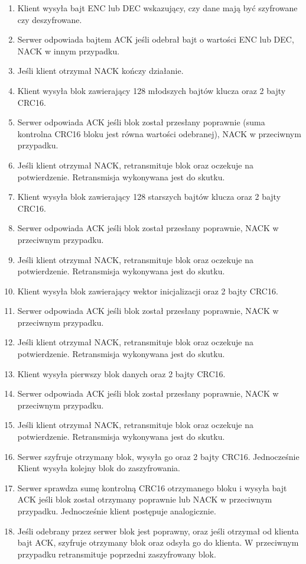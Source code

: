 \begin{enumerate}[noitemsep]
\item Klient wysyła bajt ENC lub DEC wskazujący, czy dane mają być szyfrowane czy deszyfrowane.
\item Serwer odpowiada bajtem ACK jeśli odebrał bajt o wartości ENC lub DEC, NACK w innym przypadku.
\item Jeśli klient otrzymał NACK kończy działanie.
\item Klient wysyła blok zawierający 128 młodszych bajtów klucza oraz 2 bajty CRC16.
\item Serwer odpowiada ACK jeśli blok został przesłany poprawnie (suma kontrolna CRC16 bloku jest równa wartości odebranej), NACK w przeciwnym przypadku.
\item Jeśli klient otrzymał NACK, retransmituje blok oraz oczekuje na potwierdzenie. Retransmisja wykonywana jest do skutku.
\item Klient wysyła blok zawierający 128 starszych bajtów klucza oraz 2 bajty CRC16.
\item Serwer odpowiada ACK jeśli blok został przesłany poprawnie, NACK w przeciwnym przypadku.
\item Jeśli klient otrzymał NACK, retransmituje blok oraz oczekuje na potwierdzenie. Retransmisja wykonywana jest do skutku.
\item Klient wysyła blok zawierający wektor inicjalizacji oraz 2 bajty CRC16.
\item Serwer odpowiada ACK jeśli blok został przesłany poprawnie, NACK w przeciwnym przypadku.
\item Jeśli klient otrzymał NACK, retransmituje blok oraz oczekuje na potwierdzenie. Retransmisja wykonywana jest do skutku.
\item Klient wysyła pierwszy blok danych oraz 2 bajty CRC16.
\item Serwer odpowiada ACK jeśli blok został przesłany poprawnie, NACK w przeciwnym przypadku.
\item Jeśli klient otrzymał NACK, retransmituje blok oraz oczekuje na potwierdzenie. Retransmisja wykonywana jest do skutku.
\item Serwer szyfruje otrzymany blok, wysyła go oraz 2 bajty CRC16. Jednocześnie Klient wysyła kolejny blok do zaszyfrowania.
\item Serwer sprawdza sumę kontrolną CRC16 otrzymanego bloku i wysyła bajt ACK jeśli blok został otrzymany poprawnie lub NACK w przeciwnym przypadku. Jednocześnie klient postępuje analogicznie.
\item Jeśli odebrany przez serwer blok jest poprawny, oraz jeśli otrzymał od klienta bajt ACK, szyfruje otrzymany blok oraz odsyła go do klienta. W przeciwnym przypadku retransmituje poprzedni zaszyfrowany blok.

\end{enumerate}
